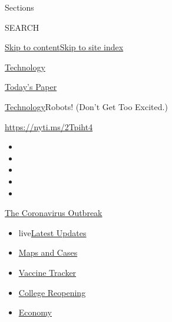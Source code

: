 Sections

SEARCH

\protect\hyperlink{site-content}{Skip to
content}\protect\hyperlink{site-index}{Skip to site index}

\href{https://www.nytimes3xbfgragh.onion/section/technology}{Technology}

\href{https://myaccount.nytimes3xbfgragh.onion/auth/login?response_type=cookie\&client_id=vi}{}

\href{https://www.nytimes3xbfgragh.onion/section/todayspaper}{Today's
Paper}

\href{/section/technology}{Technology}\textbar{}Robots! (Don't Get Too
Excited.)

\url{https://nyti.ms/2Tpiht4}

\begin{itemize}
\item
\item
\item
\item
\item
\end{itemize}

\href{https://www.nytimes3xbfgragh.onion/news-event/coronavirus?action=click\&pgtype=Article\&state=default\&region=TOP_BANNER\&context=storylines_menu}{The
Coronavirus Outbreak}

\begin{itemize}
\tightlist
\item
  live\href{https://www.nytimes3xbfgragh.onion/2020/08/04/world/coronavirus-covid-19.html?action=click\&pgtype=Article\&state=default\&region=TOP_BANNER\&context=storylines_menu}{Latest
  Updates}
\item
  \href{https://www.nytimes3xbfgragh.onion/interactive/2020/us/coronavirus-us-cases.html?action=click\&pgtype=Article\&state=default\&region=TOP_BANNER\&context=storylines_menu}{Maps
  and Cases}
\item
  \href{https://www.nytimes3xbfgragh.onion/interactive/2020/science/coronavirus-vaccine-tracker.html?action=click\&pgtype=Article\&state=default\&region=TOP_BANNER\&context=storylines_menu}{Vaccine
  Tracker}
\item
  \href{https://www.nytimes3xbfgragh.onion/2020/08/02/us/covid-college-reopening.html?action=click\&pgtype=Article\&state=default\&region=TOP_BANNER\&context=storylines_menu}{College
  Reopening}
\item
  \href{https://www.nytimes3xbfgragh.onion/live/2020/08/03/business/stock-market-today-coronavirus?action=click\&pgtype=Article\&state=default\&region=TOP_BANNER\&context=storylines_menu}{Economy}
\end{itemize}

